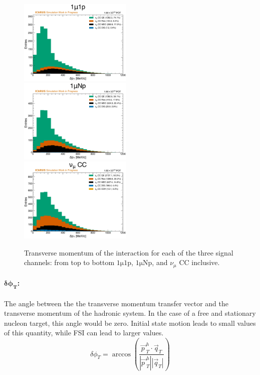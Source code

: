 \begin{figure}[!htb]
    \centering
    \includegraphics[width=0.48\textwidth]{figures/neutrino_selection/signal_hist1d_1mu1p_delta_pT.pdf}\\
    \includegraphics[width=0.48\textwidth]{figures/neutrino_selection/signal_hist1d_1muNp_delta_pT.pdf}\\
    \includegraphics[width=0.48\textwidth]{figures/neutrino_selection/signal_hist1d_1muX_delta_pT.pdf}\\
    \caption{Transverse momentum of the interaction for each of the three signal channels: from top to bottom $\mathrm{1\mu 1p}$, $\mathrm{1\mu Np}$, and $\nu_\mu$ CC inclusive.}
    \label{fig:delta_pT}
\end{figure}

\paragraph{$\mathbf{\delta \phi_T}$:}
The angle between the the transverse momentum transfer vector and the transverse momentum of the hadronic system. In the case of a free and stationary nucleon target, this angle would be zero. Initial state motion leads to small values of this quantity, while FSI can lead to larger values.
\begin{equation}
    \delta \phi_T = \arccos\left(\frac{\vec{p\ }^h_T \cdot \vec{q}_T}{|\vec{p\ }^h_T||\vec{q}_T|}\right)
\end{equation}

